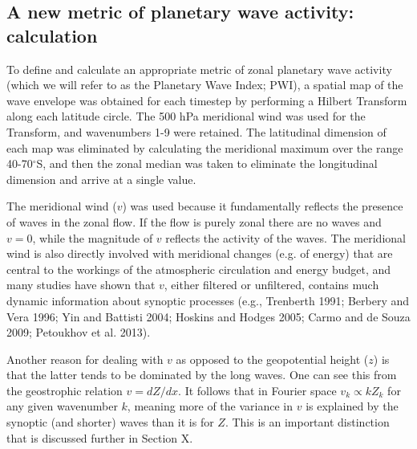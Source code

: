 \subsection{A new metric of planetary wave activity: calculation}

To define and calculate an appropriate metric of zonal planetary wave activity (which we will refer to as the Planetary Wave Index; PWI), a spatial map of the wave envelope was obtained for each timestep by performing a Hilbert Transform along each latitude circle. The 500 hPa meridional wind was used for the Transform, and wavenumbers 1-9 were retained. The latitudinal dimension of each map was eliminated by calculating the meridional maximum over the range 40-70$^{\circ}$S, and then the zonal median was taken to eliminate the longitudinal dimension and arrive at a single value. 

The meridional wind ($v$) was used because it fundamentally reflects the presence of waves in the zonal flow. If the flow is purely zonal there are no waves and $v = 0$, while the magnitude of $v$ reflects the activity of the waves. The meridional wind is also directly involved with meridional changes (e.g. of energy) that are central to the workings of the atmospheric circulation and energy budget, and many studies have shown that $v$, either filtered or unfiltered, contains much dynamic information about synoptic processes (e.g., Trenberth 1991; Berbery and Vera 1996; Yin and Battisti 2004; Hoskins and Hodges 2005; Carmo and de Souza 2009; Petoukhov et al. 2013). 

Another reason for dealing with $v$ as opposed to the geopotential height ($z$) is that the latter tends to be dominated by the long waves. One can see this from the geostrophic relation $v = dZ / dx$. It follows that in Fourier space $v_k \propto k Z_k$ for any given wavenumber $k$, meaning more of the variance in $v$ is explained by the synoptic (and shorter) waves than it is for $Z$. This is an important distinction that is discussed further in Section X.

